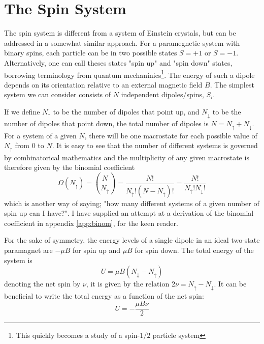 \documentclass[10pt,a4paper]{amsart}
\begin{document}
\section{The Spin System}
The spin system is different from a system of Einstein crystals, but can be addressed in a somewhat similar approach. For a paramegnetic system with binary spins, each particle can be in two possible states $S=+1$ or $S=-1$. Alternatively, one can call theses states "spin up" and "spin down" states, borrowing terminology from quantum mechaninics\footnote{This quickly becomes a study of a spin-$1/2$ particle system}. The energy of such a dipole depends on its orientation relative to an external magnetic field $B$. The simplest system we can consider consists of $N$ independent dipoles/spins, $S_i$. 

If we define $N_{\uparrow}$ to be the number of dipoles that point up, and $N_{\downarrow}$ to be the number of dipoles that point down, the total number of dipoles is $N=N_{\uparrow}+N_{\downarrow}$. For a system of a given $N$, there will be one macrostate for each possible value of $N_{\uparrow}$ from $0$ to $N$. It is easy to see that the number of different systems is governed by combinatorical mathematics and the multiplicity of any given macrostate is therefore given by the binomial coefficient
\begin{equation}
\Omega(N_{\uparrow}) = \binom{N}{N_{\uparrow}}=\frac{N!}{N_{\uparrow}!(N-N_{\uparrow})!}=\frac{N!}{N_{\uparrow}!N_{\downarrow}!}
\end{equation}
which is another way of saying; "how many different systems of a given number of spin up can I have?". I have supplied an attempt at a derivation of the binomial coefficient in appendix \ref{app:binom}, for the keen reader.

For the sake of symmetry, the energy levels of a single dipole in an ideal two-state paramagnet are $-\mu B$ for spin up and $\mu B$ for spin down. The total energy of the system is
\begin{equation}
U = \mu B(N_{\downarrow}-N_{\uparrow})
\end{equation}
denoting the net spin by $\nu$, it is given by the relation $2\nu = N_{\uparrow}-N_{\downarrow}$. It can be beneficial to write the total energy as a function of the net spin:
\begin{equation}
U = -\frac{\mu B \nu}{2}
\end{equation} 
\end{document}
